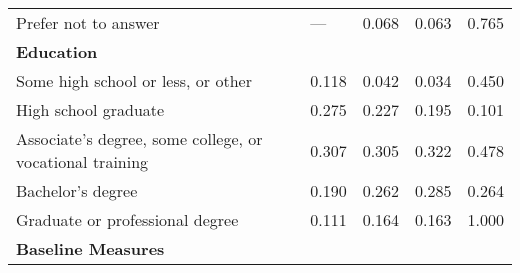 {\begin{tabular}{L{5.5cm} C{3.5cm} C{3.5cm} C{3.5cm} C{4cm}}
                   Prefer not to answer                   &                           ---                            &                          0.068                           &                          0.063                           &                          0.765                            \\
\textbf{Education}                                        &                                                          &                                                          &                                                          &                                                           \\
            Some high school or less, or other            &                          0.118                           &                          0.042                           &                          0.034                           &                          0.450                            \\
                   High school graduate                   &                          0.275                           &                          0.227                           &                          0.195                           &                          0.101                            \\
 Associate's degree, some college, or vocational training &                          0.307                           &                          0.305                           &                          0.322                           &                          0.478                            \\
                    Bachelor's degree                     &                          0.190                           &                          0.262                           &                          0.285                           &                          0.264                            \\
             Graduate or professional degree              &                          0.111                           &                          0.164                           &                          0.163                           &                          1.000                            \\
\hline
\textbf{Baseline Measures}                                &                                                          &                                                          &                                                          &                                                           \\

\end{tabular}}
